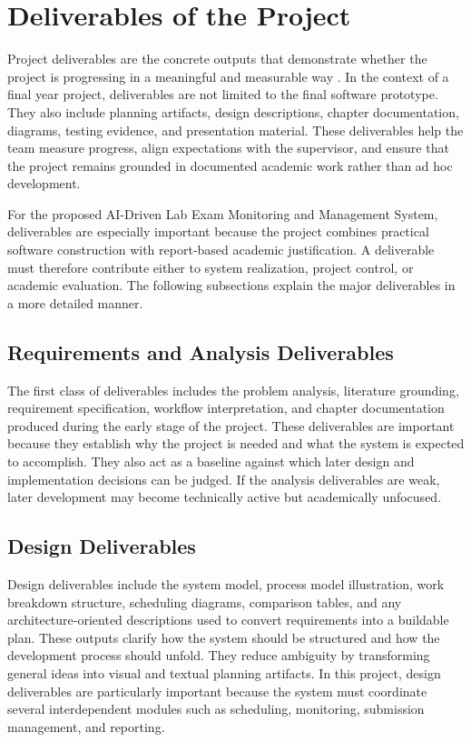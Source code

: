 \section{Deliverables of the Project}

Project deliverables are the concrete outputs that demonstrate whether the project is progressing in a meaningful and measurable way \cite{del1}. In the context of a final year project, deliverables are not limited to the final software prototype. They also include planning artifacts, design descriptions, chapter documentation, diagrams, testing evidence, and presentation material. These deliverables help the team measure progress, align expectations with the supervisor, and ensure that the project remains grounded in documented academic work rather than ad hoc development.

For the proposed AI-Driven Lab Exam Monitoring and Management System, deliverables are especially important because the project combines practical software construction with report-based academic justification. A deliverable must therefore contribute either to system realization, project control, or academic evaluation. The following subsections explain the major deliverables in a more detailed manner.

\subsection{Requirements and Analysis Deliverables}

The first class of deliverables includes the problem analysis, literature grounding, requirement specification, workflow interpretation, and chapter documentation produced during the early stage of the project. These deliverables are important because they establish why the project is needed and what the system is expected to accomplish. They also act as a baseline against which later design and implementation decisions can be judged. If the analysis deliverables are weak, later development may become technically active but academically unfocused.

\subsection{Design Deliverables}

Design deliverables include the system model, process model illustration, work breakdown structure, scheduling diagrams, comparison tables, and any architecture-oriented descriptions used to convert requirements into a buildable plan. These outputs clarify how the system should be structured and how the development process should unfold. They reduce ambiguity by transforming general ideas into visual and textual planning artifacts. In this project, design deliverables are particularly important because the system must coordinate several interdependent modules such as scheduling, monitoring, submission management, and reporting.

